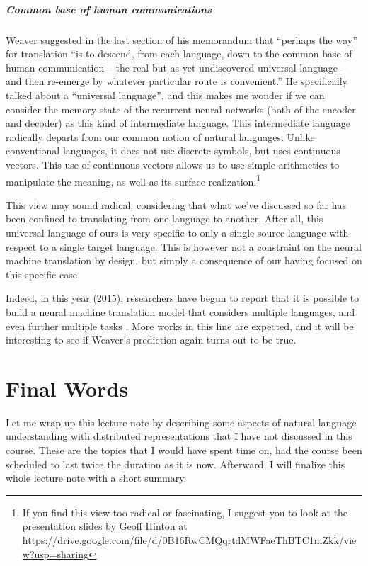 \documentclass{report}
\begin{document}
\paragraph{Common base of human communications}

Weaver suggested in the last section of his memorandum that ``perhaps the way''
for translation ``is to descend, from each language, down to the common base of
human communication -- the real but as yet undiscovered universal language --
and then re-emerge by whatever particular route is convenient.'' He specifically
talked about a ``universal language'', and this makes me wonder if we can
consider the memory state of the recurrent neural networks (both of the encoder
and decoder) as this kind of intermediate language. This intermediate language
radically departs from our common notion of natural languages. Unlike
conventional languages, it does not use discrete symbols, but uses continuous
vectors. This use of continuous vectors allows us to use simple arithmetics to
manipulate the meaning, as well as its surface realization.\footnote{
    If you find this view too radical or fascinating, I suggest you to look at
    the presentation slides by Geoff Hinton at
    \url{https://drive.google.com/file/d/0B16RwCMQqrtdMWFaeThBTC1mZkk/view?usp=sharing}
}

This view may sound radical, considering that what we've discussed so far has
been confined to translating from one language to another. After all, this
universal language of ours is very specific to only a single source language
with respect to a single target language. This is however not a constraint on
the neural machine translation by design, but simply a consequence of our having
focused on this specific case. 

Indeed, in this year (2015), researchers have begun to report that it is
possible to build a neural machine translation model that considers multiple
languages, and even further multiple tasks \citep{dong2015multi,luong2015}. More
works in this line are expected, and it will be interesting to see if Weaver's
prediction again turns out to be true.


\chapter{Final Words}

Let me wrap up this lecture note by describing some aspects of natural language
understanding with distributed representations that I have not discussed in this
course. These are the topics that I would have spent time on, had the course
been scheduled to last twice the duration as it is now. Afterward, I will
finalize this whole lecture note with a short summary.
\end{document}
